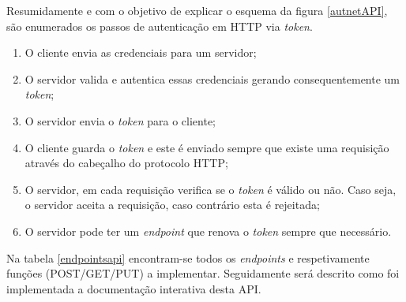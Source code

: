 Resumidamente e com o objetivo de explicar o esquema da figura \ref{autnetAPI}, são enumerados os passos de autenticação em \ac{HTTP} via \textit{token}. 

\begin{enumerate}
	\item O cliente envia as credenciais para um servidor;
	\item O servidor valida e autentica essas credenciais gerando consequentemente um \textit{token};
	\item O servidor envia o \textit{token} para o cliente;
	\item O cliente guarda o \textit{token} e este é enviado sempre que existe uma requisição através do cabeçalho do protocolo HTTP; 
	\item O servidor, em cada requisição verifica se o \textit{token} é válido ou não. Caso seja, o servidor aceita a requisição, caso contrário esta é rejeitada;
	\item O servidor pode ter um \textit{endpoint} que renova o \textit{token} sempre que necessário. 
\end{enumerate}




Na tabela \ref{endpointsapi} encontram-se todos os \textit{endpoints} e respetivamente funções (POST/GET/PUT) a implementar. Seguidamente será descrito como foi implementada a documentação interativa desta \ac{API}.  




